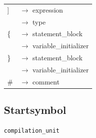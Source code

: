 \documentclass[10pt,a4paper,titlepage]{article}
\begin{document}
\begin{ttfamily}
\begin{tabular}{| l  l |}
\hspace*{1cm}] & $\to$ expression \\
 & $\to$ type \\\hline
\hspace*{1cm}\{ & $\to$ statement\_block \\
 & $\to$ variable\_initializer\\\hline
\hspace*{1cm}\} & $\to$ statement\_block \\
 & $\to$ variable\_initializer\\\hline
\hspace*{1cm}\# & $\to$ comment\\\hline
\end{tabular}
\end{ttfamily}
\subsection{Startsymbol}
\texttt{compilation\_unit}
\end{document}
